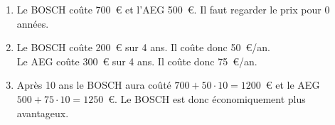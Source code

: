 %
%
    \begin{enumerate}
        \item Le BOSCH coûte 700~€ et l'AEG 500~€. Il faut regarder le prix pour 0 années.
        \item Le BOSCH coûte 200~€ sur 4 ans. Il coûte donc 50~€/an.\\
        Le AEG coûte 300~€ sur 4 ans. Il coûte donc 75~€/an.
        \item Après 10 ans le BOSCH aura coûté $700 + 50\cdot 10 = 1200$~€ et le AEG $500 + 75\cdot 10 = 1250$~€. Le BOSCH est donc économiquement plus avantageux.
    \end{enumerate}
